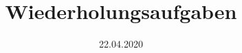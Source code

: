 

\title{Wiederholungsaufgaben}
\date{%
  22.04.2020
}



\maketitle
\thispagestyle{empty}
\tableofcontents
\newpage





\printbibliography{}


